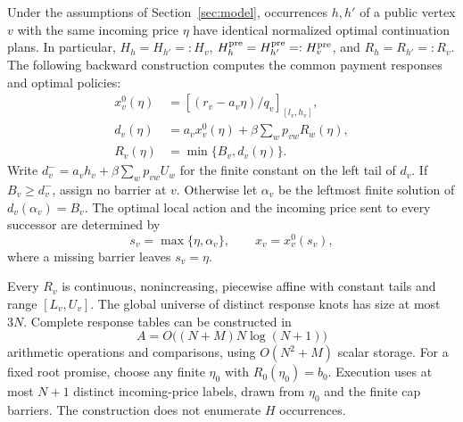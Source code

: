 \begin{theorem}\label{thm:quotient}
Under the assumptions of Section~\ref{sec:model}, occurrences $h,h'$ of a public vertex $v$ with the same incoming price $\eta$ have identical normalized optimal continuation plans. In particular, $H_h=H_{h'}=:H_v$, $H_h^{\rm pre}=H_{h'}^{\rm pre}=:H_v^{\rm pre}$, and $R_h=R_{h'}=:R_v$. The following backward construction computes the common payment responses and optimal policies:
\begin{align}
 x_v^0(\eta)&=\left[(r_v-a_v\eta)/q_v\right]_{[l_v,h_v]},\label{eq:local}\\
 d_v(\eta)&=a_vx_v^0(\eta)+\beta\sum_wp_{vw}R_w(\eta),\label{eq:pre}\\
 R_v(\eta)&=\min\{B_v,d_v(\eta)\}.\label{eq:capped}
\end{align}
Write $d_v^-=a_vh_v+\beta\sum_wp_{vw}U_w$ for the finite constant on the left tail of $d_v$. If $B_v\geq d_v^-$, assign no barrier at $v$. Otherwise let $\alpha_v$ be the leftmost finite solution of $d_v(\alpha_v)=B_v$. The optimal local action and the incoming price sent to every successor are determined by
\begin{equation}\label{eq:reflection}
 s_v=\max\{\eta,\alpha_v\},\qquad x_v=x_v^0(s_v),
\end{equation}
where a missing barrier leaves $s_v=\eta$.

Every $R_v$ is continuous, nonincreasing, piecewise affine with constant tails and range $[L_v,U_v]$. The global universe of distinct response knots has size at most $3N$. Complete response tables can be constructed in
\begin{equation}\label{eq:arithmetic}
 A=O\bigl((N+M)N\log(N+1)\bigr)
\end{equation}
arithmetic operations and comparisons, using $O(N^2+M)$ scalar storage. For a fixed root promise, choose any finite $\eta_0$ with $R_0(\eta_0)=b_0$. Execution uses at most $N+1$ distinct incoming-price labels, drawn from $\eta_0$ and the finite cap barriers. The construction does not enumerate $H$ occurrences.
\end{theorem}
